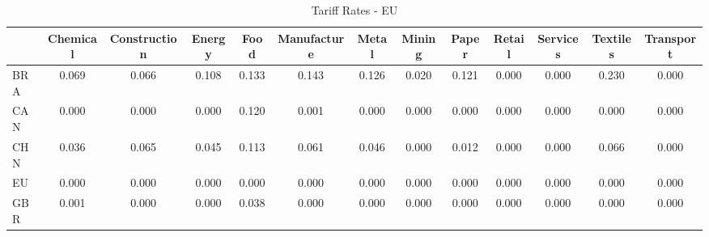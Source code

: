 \begin{table}[htbp]
\centering
\caption{Tariff Rates - EU} 
\label{tab:tariff_EU}
\begin{tabular}{lcccccccccccc}
  \hline
 & Chemical & Construction & Energy & Food & Manufacture & Metal & Mining & Paper & Retail & Services & Textiles & Transport \\ 
  \hline
BRA & \textcolor[RGB]{42,27,212}{0.069} & \textcolor[RGB]{47,30,208}{0.066} & \textcolor[RGB]{25,16,230}{0.108} & \textcolor[RGB]{8,5,246}{0.133} & \textcolor[RGB]{6,4,249}{0.143} & \textcolor[RGB]{11,7,244}{0.126} & \textcolor[RGB]{89,58,166}{0.020} & \textcolor[RGB]{13,8,242}{0.121} & \textcolor[RGB]{255,165,0}{0.000} & \textcolor[RGB]{255,165,0}{0.000} & \textcolor[RGB]{2,1,253}{0.230} & \textcolor[RGB]{255,165,0}{0.000} \\ 
  CAN & \textcolor[RGB]{255,165,0}{0.000} & \textcolor[RGB]{255,165,0}{0.000} & \textcolor[RGB]{255,165,0}{0.000} & \textcolor[RGB]{15,10,240}{0.120} & \textcolor[RGB]{104,67,151}{0.001} & \textcolor[RGB]{255,165,0}{0.000} & \textcolor[RGB]{255,165,0}{0.000} & \textcolor[RGB]{255,165,0}{0.000} & \textcolor[RGB]{255,165,0}{0.000} & \textcolor[RGB]{255,165,0}{0.000} & \textcolor[RGB]{255,165,0}{0.000} & \textcolor[RGB]{255,165,0}{0.000} \\ 
  CHN & \textcolor[RGB]{74,48,181}{0.036} & \textcolor[RGB]{49,32,206}{0.065} & \textcolor[RGB]{62,40,193}{0.045} & \textcolor[RGB]{19,12,236}{0.113} & \textcolor[RGB]{51,33,204}{0.061} & \textcolor[RGB]{59,38,196}{0.046} & \textcolor[RGB]{255,165,0}{0.000} & \textcolor[RGB]{96,62,159}{0.012} & \textcolor[RGB]{255,165,0}{0.000} & \textcolor[RGB]{255,165,0}{0.000} & \textcolor[RGB]{45,29,210}{0.066} & \textcolor[RGB]{255,165,0}{0.000} \\ 
  EU & \textcolor[RGB]{255,165,0}{0.000} & \textcolor[RGB]{255,165,0}{0.000} & \textcolor[RGB]{255,165,0}{0.000} & \textcolor[RGB]{255,165,0}{0.000} & \textcolor[RGB]{255,165,0}{0.000} & \textcolor[RGB]{255,165,0}{0.000} & \textcolor[RGB]{255,165,0}{0.000} & \textcolor[RGB]{255,165,0}{0.000} & \textcolor[RGB]{255,165,0}{0.000} & \textcolor[RGB]{255,165,0}{0.000} & \textcolor[RGB]{255,165,0}{0.000} & \textcolor[RGB]{255,165,0}{0.000} \\ 
  GBR & \textcolor[RGB]{106,69,149}{0.001} & \textcolor[RGB]{255,165,0}{0.000} & \textcolor[RGB]{255,165,0}{0.000} & \textcolor[RGB]{70,45,185}{0.038} & \textcolor[RGB]{255,165,0}{0.000} & \textcolor[RGB]{255,165,0}{0.000} & \textcolor[RGB]{255,165,0}{0.000} & \textcolor[RGB]{255,165,0}{0.000} & \textcolor[RGB]{255,165,0}{0.000} & \textcolor[RGB]{255,165,0}{0.000} & \textcolor[RGB]{255,165,0}{0.000} & \textcolor[RGB]{255,165,0}{0.000} \\ 

\end{tabular}
\end{table}
